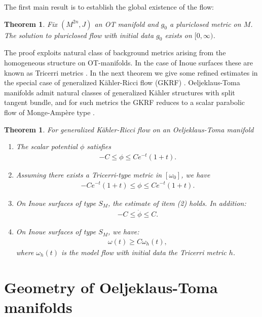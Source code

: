 \documentclass[12pt]{amsart}
\numberwithin{equation}{section}
\newtheorem{thm}[prop]{Theorem}
\numberwithin{prop}{section}
\theoremstyle{definition}
\newcommand{\gw}{\omega}
\begin{document}
The first main result is to establish the global existence of the flow:

\begin{thm} \label{t:mainthm1} Fix $(M^{2n}, J)$ an OT manifold and $g_0$ a pluriclosed metric on $M$.  The solution to pluriclosed flow with initial data $g_0$ exists on $[0, \infty)$.
\end{thm}

\noindent The proof exploits natural class of background metrics arising from the homogeneous structure on OT-manifolds.  In the case of Inoue surfaces these are known as Tricerri metrics \cite{tricerri1982some}.  In the next theorem we give some refined estimates in the special case of generalized K\"ahler-Ricci flow (GKRF) \cite{GKRF}.  Oeljeklaus-Toma manifolds admit natural classes of generalized K\"ahler structures with split tangent bundle, and for such metrics the GKRF reduces to a scalar parabolic flow of Monge-Amp\`ere type \cite{StreetsSTB}.

\begin{thm} \label{t:mainthm2} For generalized K\"ahler-Ricci flow on an Oeljeklaus-Toma manifold
\begin{enumerate}
\item The scalar potential $\phi$ satisfies
\begin{align*}
    - C \leq \phi \leq C e^{-t}(1 + t).
\end{align*}
\item Assuming there exists a Tricerri-type metric in $[\gw_0]$, we have
\begin{align*}
    - C e^{-t}(1 + t) \leq \phi \leq C e^{-t}(1 + t).
\end{align*}
\item On Inoue surfaces of type $S_M$, the estimate of item (2) holds. In addition:
\begin{align*}
    -C\leq \dot{\phi}\leq C.
\end{align*}
\item On Inoue surfaces of type $S_M$, we have:
\begin{align*}
        \omega(t)\geq C\omega_h(t),
\end{align*}
where $\omega_h(t)$ is the model flow with initial data the Tricerri metric $h$.
\end{enumerate}
\end{thm}


%
%
%
%
\section{Geometry of Oeljeklaus-Toma manifolds} \label{s:OT}
%
%
%
%
\end{document}
